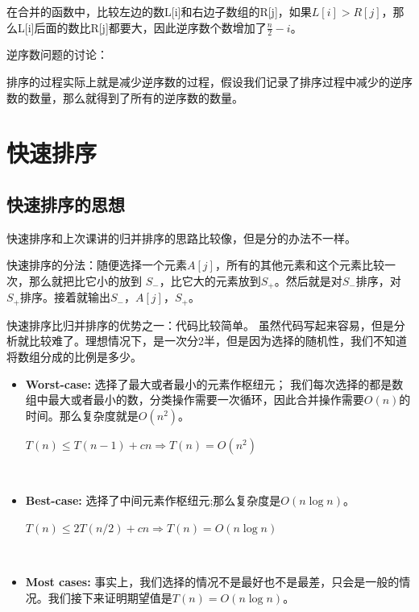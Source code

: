 	在合并的函数中，比较左边的数L[i]和右边子数组的R[j]，如果$L[i] > R[j]$，那么L[i]后面的数比R[j]都要大，因此逆序数个数增加了$ \frac{n}{2} -i$。

	逆序数问题的讨论：
	
	排序的过程实际上就是减少逆序数的过程，假设我们记录了排序过程中减少的逆序数的数量，那么就得到了所有的逆序数的数量。
	
\section{快速排序}
\subsection{快速排序的思想}
	快速排序和上次课讲的归并排序的思路比较像，但是分的办法不一样。

	快速排序的分法：随便选择一个元素$A[j]$，所有的其他元素和这个元素比较一次，那么就把比它小的放到 $S_{-}$，比它大的元素放到$S_{+}$。然后就是对$S_{-}$排序，对$S_{+}$排序。接着就输出$S_{-}$，$A[j]$，$S_{+}$。

	快速排序比归并排序的优势之一：代码比较简单。	虽然代码写起来容易，但是分析就比较难了。理想情况下，是一次分2半，但是因为选择的随机性，我们不知道将数组分成的比例是多少。
\begin{itemize}
 \item 
{\bf Worst-case:} 选择了最大或者最小的元素作枢纽元； 我们每次选择的都是数组中最大或者最小的数，分类操作需要一次循环，因此合并操作需要$O(n)$的时间。那么复杂度就是$O(n^2)$。


\begin{center}
$T(n) \leq T(n-1) + cn \Rightarrow T(n) = O(n^2)$
\end{center}

\ \\
\item 
{\bf Best-case:} 选择了中间元素作枢纽元;那么复杂度是$O(n \log n)$。

\begin{center}
$T(n) \leq 2T(n/2) + cn \Rightarrow T(n) = O(n \log n)$
\end{center}

\ \\
\item 
{\bf Most cases:} 事实上，我们选择的情况不是最好也不是最差，只会是一般的情况。我们接下来证明期望值是$T(n) = O(n \log n)$。

\end{itemize}
